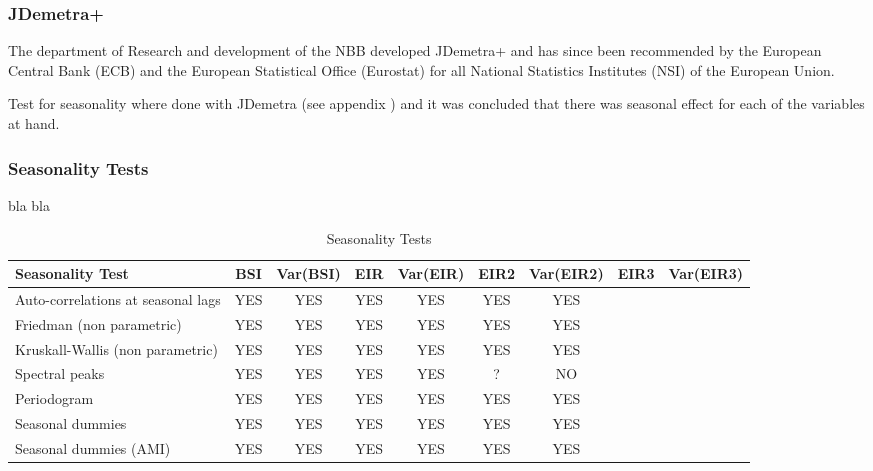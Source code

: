 \documentclass[12pt,a4paper,oneside]{book}
\begin{document}
\subsubsection{JDemetra+}


The department of Research and development of the NBB developed JDemetra+ and has since been recommended by the European Central Bank (ECB) and the European Statistical Office (Eurostat) for all National Statistics Institutes (NSI) of the European Union. 


Test for seasonality where done with JDemetra (see appendix ) and it was concluded that there was seasonal effect for each of the variables at hand.

\subsubsection{Seasonality Tests}

bla bla

\begin{table}[H]
    \centering \small
    \begin{tabular}{l|c|c|c|c|c|c|c|c}
\textbf{Seasonality Test} & BSI & Var(BSI) & EIR & Var(EIR) & EIR2 & Var(EIR2) & EIR3 & Var(EIR3) \\ \hline
Auto-correlations at seasonal lags& YES & YES & YES & YES & YES & YES \\
Friedman (non parametric)       & YES   & YES & YES & YES & YES & YES \\
Kruskall-Wallis (non parametric)& YES   & YES & YES & YES & YES & YES \\
Spectral peaks                  & YES   & YES & YES & YES & ?   & NO \\
Periodogram                     & YES   & YES & YES & YES & YES & YES \\
Seasonal dummies                & YES   & YES & YES & YES & YES & YES \\
Seasonal dummies (AMI)          & YES   & YES & YES & YES & YES & YES \\
    \end{tabular}
    \caption{Seasonality Tests}
    \label{tab:Seasonality Tests}
\end{table}{}
\end{document}

